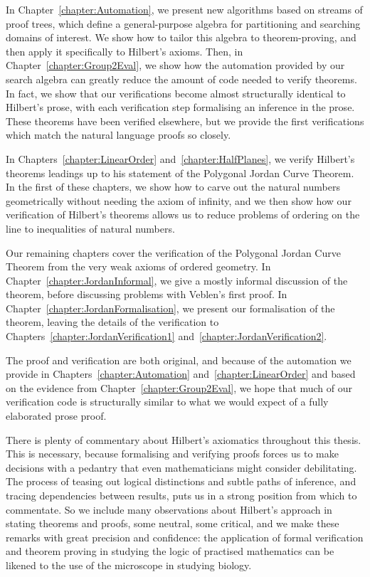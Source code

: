 In Chapter~\ref{chapter:Automation}, we present new algorithms based on streams of proof trees, which define a general-purpose algebra for partitioning and searching domains of interest. We show how to tailor this algebra to theorem-proving, and then apply it specifically to Hilbert's axioms. Then, in Chapter~\ref{chapter:Group2Eval}, we show how the automation provided by our search algebra can greatly reduce the amount of code needed to verify theorems. In fact, we show that our verifications become almost structurally identical to Hilbert's prose, with each verification step formalising an inference in the prose. These theorems have been verified elsewhere, but we provide the first verifications which match the natural language proofs so closely.

In Chapters~\ref{chapter:LinearOrder} and~\ref{chapter:HalfPlanes}, we verify Hilbert's theorems leadings up to his statement of the Polygonal Jordan Curve Theorem. In the first of these chapters, we show how to carve out the natural numbers geometrically without needing the axiom of infinity, and we then show how our verification of Hilbert's theorems allows us to reduce problems of ordering on the line to inequalities of natural numbers.

Our remaining chapters cover the verification of the Polygonal Jordan Curve Theorem from the very weak axioms of ordered geometry. In Chapter~\ref{chapter:JordanInformal}, we give a mostly informal discussion of the theorem, before discussing problems with Veblen's first proof. In Chapter~\ref{chapter:JordanFormalisation}, we present our formalisation of the theorem, leaving the details of the verification to Chapters~\ref{chapter:JordanVerification1} and~\ref{chapter:JordanVerification2}.

The proof and verification are both original, and because of the automation we provide in Chapters~\ref{chapter:Automation} and~\ref{chapter:LinearOrder} and based on the evidence from Chapter~\ref{chapter:Group2Eval}, we hope that much of our verification code is structurally similar to what we would expect of a fully elaborated prose proof.

There is plenty of commentary about Hilbert's axiomatics throughout this thesis. This is necessary, because formalising and verifying proofs forces us to make decisions with a pedantry that even mathematicians might consider debilitating. The process of teasing out logical distinctions and subtle paths of inference, and tracing dependencies between results, puts us in a strong position from which to commentate. So we include many observations about Hilbert's approach in stating theorems and proofs, some neutral, some critical, and we make these remarks with great precision and confidence: the application of formal verification and theorem proving in studying the logic of practised mathematics can be likened to the use of the microscope in studying biology.

